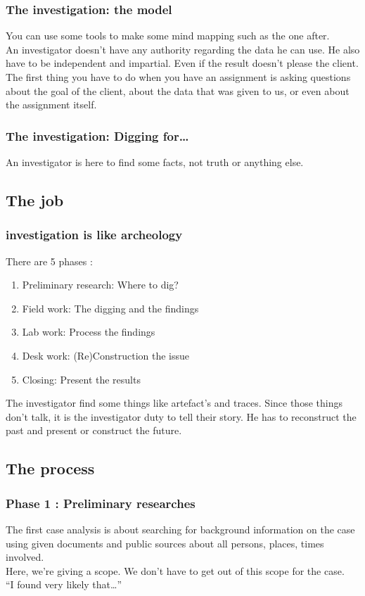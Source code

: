 \subsubsection{The investigation: the model}
You can use some tools to make some mind mapping such as the one after.\\
An investigator doesn't have any authority regarding the data he can use. He also have to be independent and impartial. Even if the result doesn't please the client.\\
The first thing you have to do when you have an assignment is asking questions about the goal of the client, about the data that was given to us, or even about the assignment itself.
\subsubsection{The investigation: Digging for\ldots}
An investigator is here to find some facts, not truth or anything else.\\
\subsection{The job}
\subsubsection{investigation is like archeology}
There are 5 phases :
\begin{enumerate}
 \item Preliminary research: Where to dig?
 \item Field work: The digging and the findings
 \item Lab work: Process the findings
 \item Desk work: (Re)Construction the issue
 \item Closing: Present the results
\end{enumerate}
The investigator find some things like artefact's and traces. Since those things don't talk, it is the investigator duty to tell their story. He has to reconstruct the past and present or construct the future.
\subsection{The process}
\subsubsection{Phase 1 : Preliminary researches}
The first case analysis is about searching for background information on the case using given documents and public sources about all persons, places, times involved.\\
Here, we're giving a scope. We don't have to get out of this scope for the case.\\
\enquote{I found very likely that\ldots}